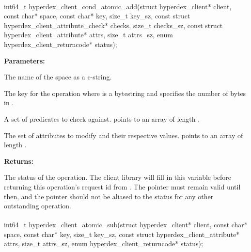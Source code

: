\paragraph{}
\begin{ccode}
int64_t hyperdex_client_cond_atomic_add(struct hyperdex_client* client,
                const char* space,
                const char* key, size_t key_sz,
                const struct hyperdex_client_attribute_check* checks, size_t checks_sz,
                const struct hyperdex_client_attribute* attrs, size_t attrs_sz,
                enum hyperdex_client_returncode* status);
\end{ccode}
\funcdesc 

\noindent\textbf{Parameters:}
\begin{description}[labelindent=\widthof{{\code{checks}, \code{checks\_sz}}},leftmargin=*,noitemsep,nolistsep,align=right]
\item[\code{space}] The name of the space as a c-string.
\item[\code{key}, \code{key\_sz}] The key for the operation where  is a bytestring and  specifies the number of bytes in .
\item[\code{checks}, \code{checks\_sz}] A set of predicates to check against.   points to an array of length .
\item[\code{attrs}, \code{attrs\_sz}] The set of attributes to modify and their respective values.   points to an array of length .
\end{description}

\noindent\textbf{Returns:}
\begin{description}[labelindent=\widthof{{\code{status}}},leftmargin=*,noitemsep,nolistsep,align=right]
\item[\code{status}] The status of the operation.  The client library will fill in this variable before returning this operation's request id from .  The pointer must remain valid until then, and the pointer should not be aliased to the status for any other outstanding operation.
\end{description}

\paragraph{}
\begin{ccode}
int64_t hyperdex_client_atomic_sub(struct hyperdex_client* client,
                const char* space,
                const char* key, size_t key_sz,
                const struct hyperdex_client_attribute* attrs, size_t attrs_sz,
                enum hyperdex_client_returncode* status);
\end{ccode}
\funcdesc 

